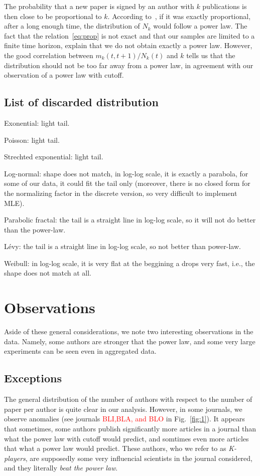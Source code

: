 \documentclass[aps,prl,floatfix,twocolumn]{revtex4-1}
\begin{document}
The probability that a new paper is signed by an author with $k$ publications is then close to be proportional to $k$. 
According to~\cite{Kra00}, if it was exactly proportional, after a long enough time, the distribution of $N_k$ would follow a power law. 
The fact that the relation~\eqref{eq:prop} is not exact and that our samples are limited to a finite time horizon, explain that we do not obtain exactly a power law. 
However, the good correlation between $m_k(t,t+1)/N_k(t)$ and $k$ tells us that the distribution should not be too far away from a power law, in agreement with our observation of a power law with cutoff.

\subsection{List of discarded distribution}
Exonential: light tail. 

Poisson: light tail. 

Strechted exponential: light tail. 

Log-normal: shape does not match, in log-log scale, it is exactly a parabola, for some of our data, it could fit the tail only (moreover, there is no closed form for the normalizing factor in the discrete version, so very difficult to implement MLE).

Parabolic fractal: the tail is a straight line in log-log scale, so it will not do better than the power-law.

L\'evy: the tail is a straight line in log-log scale, so not better than power-law.

Weibull: in log-log scale, it is very flat at the beggining a drops very fast, i.e., the shape does not match at all.




\section{Observations}
Aside of these general considerations, we note two interesting observations in the data. 
Namely, some authors are stronger that the power law, and some very large experiments can be seen even in aggregated data. 

\subsection{Exceptions }
The general distribution of the number of authors with respect to the number of paper per author is quite clear in our analysis. 
However, in some journals, we observe anomalies (see journals \textcolor{red}{BLI,BLA, and BLO} in Fig.~\ref{fig:1}). 
It appears that sometimes, some authors publish significantly more articles in a journal than what the power law with cutoff would predict, and somtimes even more articles that what a power law would predict. 
These authors, who we refer to as \emph{K-players}, are supposedly some very influencial scientists in the journal considered, and they literally \emph{beat the power law}.
\end{document}
